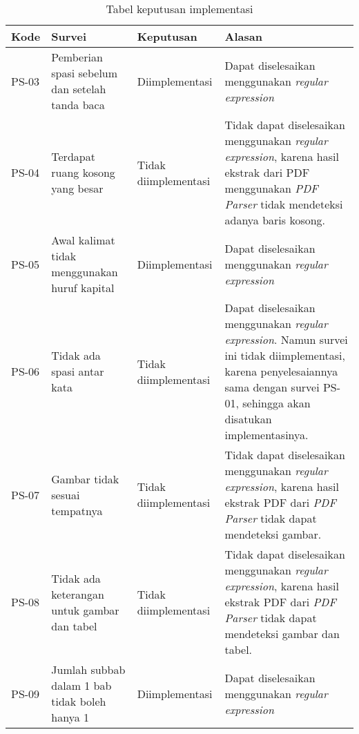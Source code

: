\begin{table}[H]
	\renewcommand{\arraystretch}{1.5}
	\caption {Tabel keputusan implementasi} \label{tab:keputusan2}
	\begin{center}
		\begin{tabular}{|p{1.5 cm}|>{\raggedright} p{4 cm}| p{2.5 cm}| p{6.5 cm}|}
		\hline
		Kode & Survei & Keputusan & Alasan \\ 
		\hline 
		PS-03 & Pemberian spasi sebelum dan setelah tanda baca & Diimplementasi & Dapat diselesaikan menggunakan \textit{regular expression} \newline \\ 
		\hline 
		PS-04 & Terdapat ruang kosong yang besar & Tidak \newline diimplementasi & Tidak dapat diselesaikan menggunakan \textit{regular expression}, karena hasil ekstrak dari PDF menggunakan \textit{PDF Parser} tidak mendeteksi adanya baris kosong. \newline \\ 		
		\hline 
		PS-05 & Awal kalimat tidak menggunakan huruf kapital & Diimplementasi & Dapat diselesaikan menggunakan \textit{regular expression} \newline \\ 
		\hline
		PS-06 & Tidak ada spasi antar kata & Tidak \newline diimplementasi & Dapat diselesaikan menggunakan \textit{regular expression}. Namun survei ini tidak
diimplementasi, karena penyelesaiannya sama dengan survei PS-01, sehingga akan disatukan implementasinya. \newline \\ 
		\hline 
		PS-07 & Gambar tidak sesuai tempatnya & Tidak \newline diimplementasi & Tidak dapat diselesaikan menggunakan \textit{regular expression}, karena hasil ekstrak PDF dari \textit{PDF Parser} tidak dapat mendeteksi gambar. \newline \\ 
		\hline 
		PS-08 & Tidak ada keterangan untuk gambar dan tabel & Tidak \newline diimplementasi & Tidak dapat diselesaikan menggunakan \textit{regular expression}, karena hasil ekstrak PDF dari \textit{PDF Parser} tidak dapat mendeteksi gambar dan tabel. \newline \\ 
		\hline 
		PS-09 & Jumlah subbab dalam 1 bab tidak boleh hanya 1 & Diimplementasi & Dapat diselesaikan menggunakan \textit{regular expression} \newline \\ 

\end{tabular}
\end{center}
\end{table}
